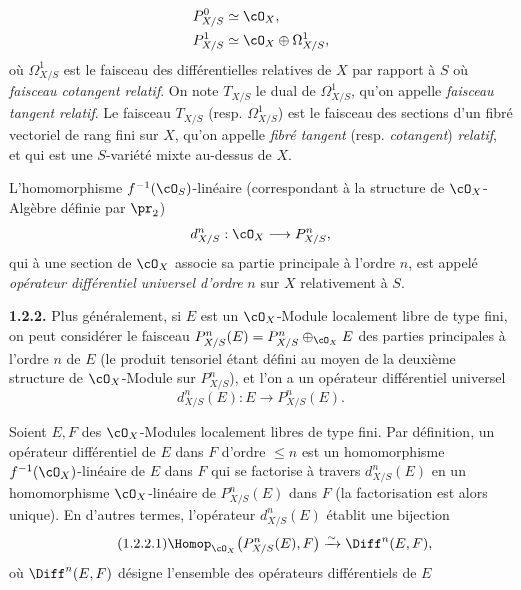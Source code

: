 \[
  \begin{aligned}
  P^0_{X/S}&\simeq\cO_X,\\
  P^1_{X/S}&\simeq\cO_X\oplus\Omega^1_{X/S},
  \end{aligned}
\]
où $\Omega^1_{X/S}$ est le faisceau des différentielles relatives de $X$ par rapport à $S$ où \emph{faisceau cotangent relatif}. On note $T_{X/S}$ le dual de $\Omega^1_{X/S}$, qu'on appelle \emph{faisceau tangent relatif}. Le faisceau $T_{X/S}$ (resp. $\Omega^1_{X/S}$) est le faisceau des sections d'un fibré vectoriel de rang fini sur $X$, qu'on appelle \emph{fibré tangent} (resp. \emph{cotangent}) \emph{relatif}, et qui est une $S$-variété mixte au-dessus de $X$.

L'homomorphisme $f^{-1}(\cO_S)$-linéaire (correspondant à la structure de $\cO_X$-Algèbre définie par $\pr_2$)
\[
  d^n_{X/S}:\cO_X\longrightarrow P^n_{X/S},
\]
qui à une section de $\cO_X$ associe sa partie principale à l'ordre $n$, est appelé \emph{opérateur différentiel universel d'ordre} $n$ sur $X$ relativement à $S$.

\textbf{1.2.2.} Plus généralement, si $E$ est un $\cO_X$-Module localement libre de type fini, on peut considérer le faisceau $P^n_{X/S}(E)=P^n_{X/S}\oplus_{\cO_X}E$ des parties principales à l'ordre $n$ de $E$ (le produit tensoriel étant défini au moyen de la deuxième structure de $\cO_X$-Module sur $P^n_{X/S}$), et l'on a un opérateur différentiel universel
\[
  d^n_{X/S}(E):E\longrightarrow P^n_{X/S}(E).
\]

Soient $E,F$ des $\cO_X$-Modules localement libres de type fini. Par définition, un opérateur différentiel de $E$ dans $F$ d'ordre $\le n$ est un homomorphisme $f^{-1}(\cO_X)$-linéaire de $E$ dans $F$ qui se factorise à travers $d^n_{X/S}(E)$ en un homomorphisme $\cO_X$-linéaire de $P^n_{X/S}(E)$ dans $F$ (la factorisation est alors unique). En d'autres termes, l'opérateur $d^n_{X/S}(E)$ établit une bijection
\begin{equation}\tag{1.2.2.1}
  \Homop_{\cO_X}\bigl(P^n_{X/S}(E),F\bigr)
  \xrightarrow{\sim}
  \Diff^n(E,F),
\end{equation}
où $\Diff^n(E,F)$ désigne l'ensemble des opérateurs différentiels de $E$

